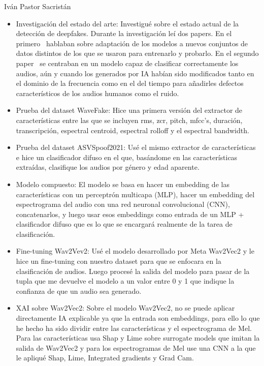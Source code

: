 \begin{contribucion}{Iván Pastor Sacristán}

\begin{itemize}

	\item Investigación del estado del arte: Investigué sobre el estado actual de la detección de deepfakes. Durante la investigación leí dos papers. En el primero~\cite{tirex2025} hablaban sobre adaptación de los modelos a nuevos conjuntos de datos distintos de los que se usaron para entrenarlo y probarlo. En el segundo paper~\cite{icanhearyou2024} se centraban en un modelo capaz de clasificar correctamente los audios, aún y cuando los generados por IA habían sido modificados tanto en el dominio de la frecuencia como en el del tiempo para añadirles defectos característicos de los audios humanos como el ruido. %
	
	\item Prueba del dataset WaveFake: Hice una primera versión del extractor de características entre las que se incluyen rms, zcr, pitch, mfcc's, duración, transcripción, espectral centroid, espectral rolloff y el espectral bandwidth.
	
	\item Prueba del dataset ASVSpoof2021: Usé el mismo extractor de características e hice un clasificador difuso en el que, basándome en las características extraídas, clasifique los audios por género y edad aparente.
	
	\item Modelo compuesto: El modelo se basa en hacer un embedding de las características con un perceptrón multicapa (MLP), hacer un embedding del espectrograma del audio con una red neuronal convolucional (CNN), concatenarlos, y luego usar esos embeddings como entrada de un MLP + clasificador difuso que es lo que se encargará realmente de la tarea de clasificación.
	
	\item Fine-tuning Wav2Vev2: Usé el modelo desarrollado por Meta Wav2Vec2 y le hice un fine-tuning con nuestro dataset para que se enfocara en la clasificación de audios. Luego procesé la salida del modelo para pasar de la tupla que me devuelve el modelo a un valor entre 0 y 1 que indique la confianza de que un audio sea generado.
	
	\item XAI sobre Wav2Vec2: Sobre el modelo Wav2Vec2, no se puede aplicar directamente IA explicable ya que la entrada son embeddings, para ello lo que he hecho ha sido dividir entre las características y el espectrograma de Mel. Para las características usa Shap y Lime sobre surrogate models que imitan la salida de Wav2Vec2 y para los espectrogramas de Mel use una CNN a la que le apliqué Shap, Lime, Integrated gradients y Grad Cam.
	

\end{itemize}
\end{contribucion}
